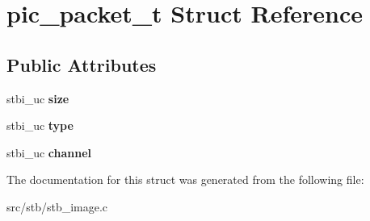 \hypertarget{structpic__packet__t}{}\section{pic\+\_\+packet\+\_\+t Struct Reference}
\label{structpic__packet__t}
\subsection*{Public Attributes}
\begin{DoxyCompactItemize}
\item 
\mbox{\label{structpic__packet__t_ad33021e40c272a20d89bdcceabb20a71}} 
stbi\+\_\+uc {\bfseries size}
\item 
\mbox{\label{structpic__packet__t_abc346cfdcff43f051830335296f14aaa}} 
stbi\+\_\+uc {\bfseries type}
\item 
\mbox{\label{structpic__packet__t_af64f17c991495f3f3baf6782a253f7cc}} 
stbi\+\_\+uc {\bfseries channel}
\end{DoxyCompactItemize}


The documentation for this struct was generated from the following file\+:\begin{DoxyCompactItemize}
\item 
src/stb/stb\+\_\+image.\+c\end{DoxyCompactItemize}
